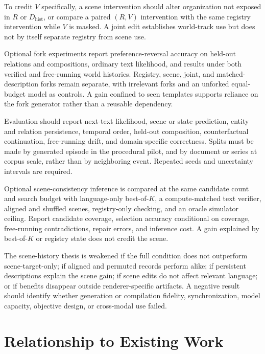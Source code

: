 \documentclass[11pt]{article}
\begin{document}
To credit $V$ specifically, a scene intervention should alter organization not exposed in $R$ or $D_{\mathrm{hist}}$, or compare a paired $(R,V)$ intervention with the same registry intervention while $V$ is masked. A joint edit establishes world-track use but does not by itself separate registry from scene use.

Optional fork experiments report preference-reversal accuracy on held-out relations and compositions, ordinary text likelihood, and results under both verified and free-running world histories. Registry, scene, joint, and matched-description forks remain separate, with irrelevant forks and an unforked equal-budget model as controls. A gain confined to seen templates supports reliance on the fork generator rather than a reusable dependency.

Evaluation should report next-text likelihood, scene or state prediction, entity and relation persistence, temporal order, held-out composition, counterfactual continuation, free-running drift, and domain-specific correctness. Splits must be made by generated episode in the procedural pilot, and by document or series at corpus scale, rather than by neighboring event. Repeated seeds and uncertainty intervals are required.

Optional scene-consistency inference is compared at the same candidate count and search budget with language-only best-of-$K$, a compute-matched text verifier, aligned and shuffled scenes, registry-only checking, and an oracle simulator ceiling. Report candidate coverage, selection accuracy conditional on coverage, free-running contradictions, repair errors, and inference cost. A gain explained by best-of-$K$ or registry state does not credit the scene.

The scene-history thesis is weakened if the full condition does not outperform scene-target-only; if aligned and permuted records perform alike; if persistent descriptions explain the scene gain; if scene edits do not affect relevant language; or if benefits disappear outside renderer-specific artifacts. A negative result should identify whether generation or compilation fidelity, synchronization, model capacity, objective design, or cross-modal use failed.

\section{Relationship to Existing Work}
\label{sec:related}
\end{document}
